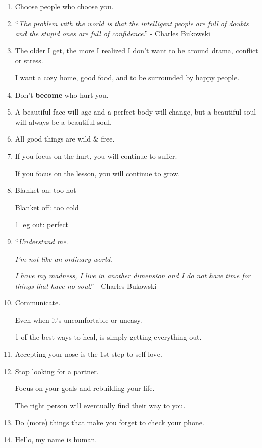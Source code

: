 \documentclass{article}
\numberwithin{equation}{section}
\begin{document}
\begin{enumerate}
    \textit{You are a soul}.
    
    \textit{You have a body}.'' - C. S. Lewis
    \item Choose people who choose you.
    \item ``\textit{The problem with the world is that the intelligent people are full of doubts and the stupid ones are full of confidence}.'' - Charles Bukowski
    \item The older I get, the more I realized I don't want to be around drama, conflict or stress.
    
    I want a cozy home, good food, and to be surrounded by happy people.
    \item Don't \textbf{become} who hurt you.
    \item A beautiful face will age and a perfect body will change, but a beautiful soul will always be a beautiful soul.
    \item All good things are wild \& free.
    \item If you focus on the hurt, you will continue to suffer.
    
    If you focus on the lesson, you will continue to grow.
    \item Blanket on: too hot
    
    Blanket off: too cold
    
    1 leg out: perfect
    \item ``\textit{Understand me}.
    
    \textit{I'm not like an ordinary world}.
    
    \textit{I have my madness, I live in another dimension and I do not have time for things that have no soul}.'' - Charles Bukowski
    \item Communicate.
    
    Even when it's uncomfortable or uneasy.
    
    1 of the best ways to heal, is simply getting everything out.
    \item Accepting your nose is the 1st step to self love.
    \item Stop looking for a partner.
    
    Focus on your goals and rebuilding your life.
    
    The right person will eventually find their way to you.
    \item Do (more) things that make you forget to check your phone.
    \item Hello, my name is human.
    

\end{enumerate}
\end{document}

